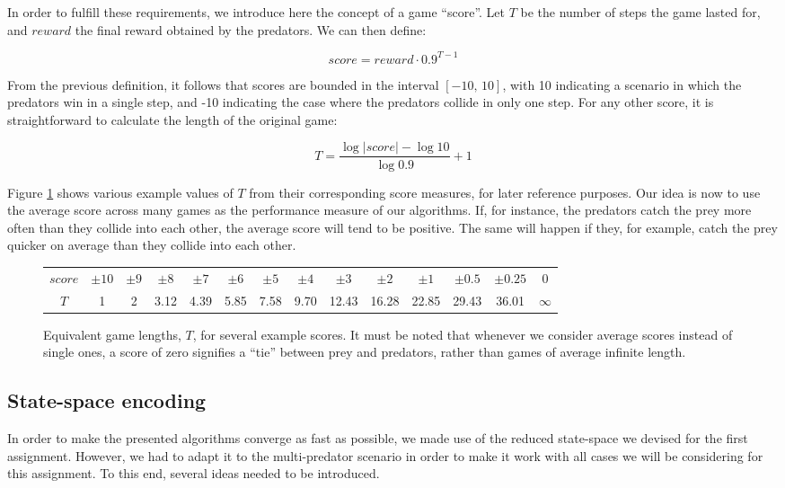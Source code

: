 \documentclass[a4paper,12pt]{article}
\begin{document}
In order to fulfill these requirements, we introduce here the concept of a game ``score''. Let $T$ be the number of steps the game lasted for, and $reward$ the final reward obtained by the predators. We can then define:

$$ score = reward \cdot 0.9^{T - 1} $$

From the previous definition, it follows that scores are bounded in the interval $[-10,\,10]$, with 10 indicating a scenario in which the predators win in a single step, and -10 indicating the case where the predators collide in only one step. For any other score, it is straightforward to calculate the length of the original game:

$$ T = \frac{\log | score | - \log 10}{\log 0.9} + 1$$

Figure \ref{fig:scores} shows various example values of $T$ from their corresponding score measures, for later reference purposes. Our idea is now to use the average score across many games as the performance measure of our algorithms. If, for instance, the predators catch the prey more often than they collide into each other, the average score will tend to be positive. The same will happen if they, for example, catch the prey quicker on average than they collide into each other.

\begin{figure}[ht!]
\centering
 \begin{tabular}{c|ccccccccccccc}
  $score$ & $\pm10$ & $\pm9$ & $\pm8$ & $\pm7$ & $\pm6$ & $\pm5$ & $\pm4$ & $\pm3$& $\pm2$ & $\pm1$ & $\pm0.5$ & $\pm0.25$ & $0$ \\
  $T$ & 1 & 2 & 3.12 & 4.39 & 5.85 & 7.58 & 9.70 & 12.43 & 16.28 & 22.85 & 29.43 & 36.01 & $\infty$ \\
 \end{tabular}
\caption{Equivalent game lengths, $T$, for several example scores. It must be noted that whenever we consider average scores instead of single ones, a score of zero signifies a ``tie'' between prey and predators, rather than games of average infinite length.}
\label{fig:scores}
\end{figure}


\subsection{State-space encoding}

In order to make the presented algorithms converge as fast as possible, we made use of the reduced state-space we devised for the first assignment. However, we had to adapt it to the multi-predator scenario in order to make it work with all cases we will be considering for this assignment. To this end, several ideas needed to be introduced.
\end{document}
